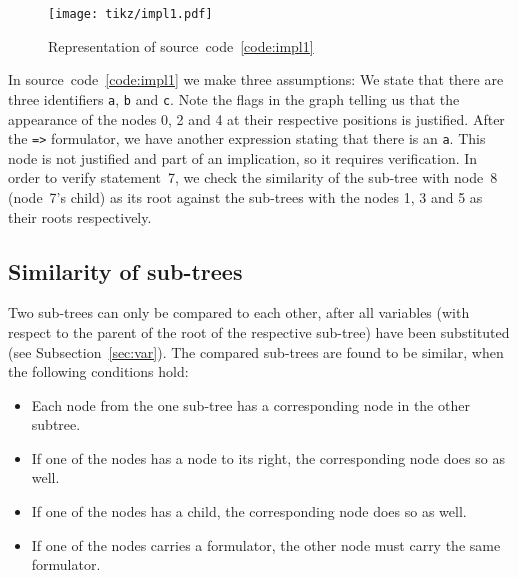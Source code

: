 \documentclass[british]{article}
\newenvironment{code}{\captionsetup{type=listing}}{}
\newcommand\prv{bc}
\newcommand\m[1]{\texttt{#1}}
\begin{document}
\begin{code}
\label{code:impl1}
\inputminted[linenos]{\prv}{examples/impl1.prove}
\end{code}

\begin{figure}[!h]
\caption{Representation of source~code~\ref{code:impl1}}\label{fig:impl1}
\centering
\texttt{[image: tikz/impl1.pdf]}
\end{figure}


In source~code~\ref{code:impl1} we make three assumptions: We state that there
are three identifiers \m{a}, \m{b} and \m{c}. Note the flags in the graph
telling us that the appearance of the nodes 0, 2 and 4 at their respective
positions is justified.
After the \m{=>} formulator, we have another expression stating that there is an
\m{a}.  This node is not justified and part of an implication, so it requires
verification. In order to verify statement~7, we check the similarity of the
sub-tree with node~8 (node~7's child) as its root against the sub-trees with the
nodes 1, 3 and 5 as their roots respectively.

\pagebreak{}

\subsection{Similarity of sub-trees}\label{sec:similar}
\textcolor{dartmouthgreen}{Two sub-trees can only be compared to each other,
after all variables (with respect to the parent of the root of the
respective sub-tree) have been substituted (see Subsection~\ref{sec:var}).} The
compared sub-trees are found to be similar, when the following conditions hold:

\begin{itemize}
	\item 
		Each node from the one sub-tree has a corresponding node in the other
		subtree.
	\item
		If one of the nodes has a node to its right, the corresponding node does
		so as well.
	\item
		If one of the nodes has a child, the corresponding node does so as well.
	\item
		If one of the nodes carries a formulator, the other node must carry the same
		formulator.
\end{itemize}
\end{document}
